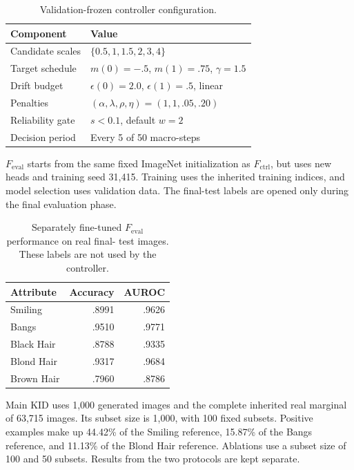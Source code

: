 \documentclass[10pt,twocolumn,letterpaper]{article}
\begin{document}
\begin{table}[ht]
\caption{Validation-frozen controller configuration.}
\label{tab:controller-config}
\centering
\small
\setlength{\tabcolsep}{4pt}
\begin{tabular}{@{}ll@{}}
\toprule
Component & Value \\
\midrule
Candidate scales & $\{0.5,1,1.5,2,3,4\}$ \\
Target schedule & $m(0)=-.5$, $m(1)=.75$, $\gamma=1.5$ \\
Drift budget & $\epsilon(0)=2.0$, $\epsilon(1)=.5$, linear \\
Penalties & $(\alpha,\lambda,\rho,\eta)=(1,1,.05,.20)$ \\
Reliability gate & $s<0.1$, default $w=2$ \\
Decision period & Every 5 of 50 macro-steps \\
\bottomrule
\end{tabular}
\end{table}

$F_{\mathrm{eval}}$ starts from the same fixed ImageNet initialization as
$F_{\mathrm{ctrl}}$, but uses new heads and training seed 31,415. Training uses
the inherited training indices, and model selection uses validation data. The
final-test labels are opened only during the final evaluation phase.

\begin{table}[ht]
\caption{Separately fine-tuned $F_{\mathrm{eval}}$ performance on real final-
test images. These labels are not used by the controller.}
\label{tab:evaluator}
\centering
\small
\begin{tabular}{lrr}
\toprule
Attribute & Accuracy & AUROC \\
\midrule
Smiling & .8991 & .9626 \\
Bangs & .9510 & .9771 \\
Black Hair & .8788 & .9335 \\
Blond Hair & .9317 & .9684 \\
Brown Hair & .7960 & .8786 \\
\bottomrule
\end{tabular}
\end{table}

Main KID uses 1,000 generated images and the complete inherited real marginal
of 63,715 images. Its subset size is 1,000, with 100 fixed subsets. Positive
examples make up 44.42\% of the Smiling reference, 15.87\% of the Bangs
reference, and 11.13\% of the Blond Hair reference. Ablations use a subset size
of 100 and 50 subsets. Results from the two protocols are kept separate.
\end{document}

